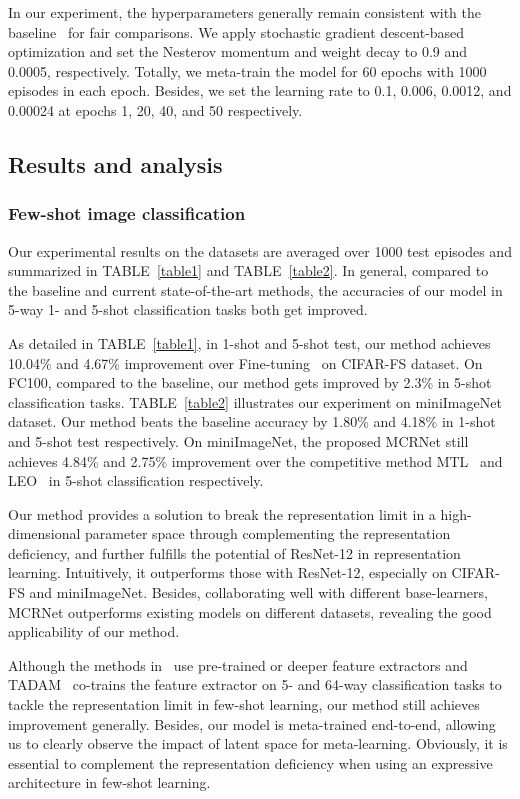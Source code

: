 \documentclass[10pt,conference,a4paper]{IEEEtran}
\begin{document}
In our experiment, the hyperparameters generally remain consistent with the baseline~\cite{lee2019meta} for fair comparisons. We apply stochastic gradient descent-based optimization and set the Nesterov momentum and weight decay to 0.9 and 0.0005, respectively. Totally, we meta-train the model for 60 epochs with 1000 episodes in each epoch. Besides, we set the learning rate to 0.1, 0.006, 0.0012, and 0.00024 at epochs 1, 20, 40, and 50 respectively.

\subsection{Results and analysis}
\subsubsection{\textbf{Few-shot image classification}}
Our experimental results on the datasets are averaged over 1000 test episodes and summarized in TABLE~\ref{table1} and TABLE~\ref{table2}. In general, compared to the baseline and current state-of-the-art methods, the accuracies of our model in 5-way 1- and 5-shot classification tasks both get improved. 

As detailed in TABLE~\ref{table1}, in 1-shot and 5-shot test, our method achieves 10.04\% and 4.67\% improvement over Fine-tuning~\cite{DBLP:journals/corr/abs-1909-02729} on CIFAR-FS dataset. On FC100, compared to the baseline, our method gets improved by 2.3\% in 5-shot classification tasks. TABLE~\ref{table2} illustrates our experiment on miniImageNet dataset. Our method beats the baseline accuracy by 1.80\% and 4.18\% in 1-shot and 5-shot test respectively. On miniImageNet, the proposed MCRNet still achieves 4.84\% and 2.75\% improvement over the competitive method MTL~\cite{Sun2019Meta} and LEO~\cite{rusu2019meta} in 5-shot classification respectively.





Our method provides a solution to break the representation limit in a high-dimensional parameter space through complementing the representation deficiency, and further fulfills the potential of ResNet-12 in representation learning. Intuitively, it outperforms those with ResNet-12, especially on CIFAR-FS and miniImageNet. Besides, collaborating well with different base-learners, MCRNet outperforms existing models on different datasets, revealing the good applicability of our method.

Although the methods in~\cite{hui2019self, rusu2019meta, DBLP:conf/cvpr/GidarisK19, Sun2019Meta} use pre-trained or deeper feature extractors and TADAM~\cite{oreshkin2018tadam} co-trains the feature extractor on 5- and 64-way classification tasks to tackle the representation limit in few-shot learning, our method still achieves improvement generally. Besides, our model is meta-trained end-to-end, allowing us to clearly observe the impact of latent space for meta-learning. Obviously, it is essential to complement the representation deficiency when using an expressive architecture in few-shot learning.
\end{document}
